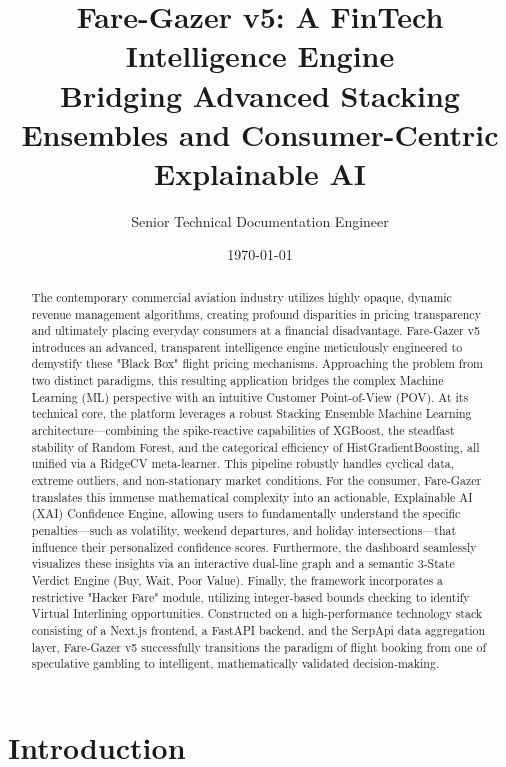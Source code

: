 \documentclass[12pt, a4paper]{article}
\title{\textbf{Fare-Gazer v5: A FinTech Intelligence Engine\\ Bridging Advanced Stacking Ensembles and Consumer-Centric Explainable AI}}
\author{Senior Technical Documentation Engineer}
\date{\today}
\begin{document}
\maketitle

\begin{abstract}
The contemporary commercial aviation industry utilizes highly opaque, dynamic revenue management algorithms, creating profound disparities in pricing transparency and ultimately placing everyday consumers at a financial disadvantage. Fare-Gazer v5 introduces an advanced, transparent intelligence engine meticulously engineered to demystify these "Black Box" flight pricing mechanisms. Approaching the problem from two distinct paradigms, this resulting application bridges the complex Machine Learning (ML) perspective with an intuitive Customer Point-of-View (POV). At its technical core, the platform leverages a robust Stacking Ensemble Machine Learning architecture—combining the spike-reactive capabilities of XGBoost, the steadfast stability of Random Forest, and the categorical efficiency of HistGradientBoosting, all unified via a RidgeCV meta-learner. This pipeline robustly handles cyclical data, extreme outliers, and non-stationary market conditions. For the consumer, Fare-Gazer translates this immense mathematical complexity into an actionable, Explainable AI (XAI) Confidence Engine, allowing users to fundamentally understand the specific penalties—such as volatility, weekend departures, and holiday intersections—that influence their personalized confidence scores. Furthermore, the dashboard seamlessly visualizes these insights via an interactive dual-line graph and a semantic 3-State Verdict Engine (Buy, Wait, Poor Value). Finally, the framework incorporates a restrictive "Hacker Fare" module, utilizing integer-based bounds checking to identify Virtual Interlining opportunities. Constructed on a high-performance technology stack consisting of a Next.js frontend, a FastAPI backend, and the SerpApi data aggregation layer, Fare-Gazer v5 successfully transitions the paradigm of flight booking from one of speculative gambling to intelligent, mathematically validated decision-making.
\end{abstract}

\newpage

\section{Introduction}
\end{document}
